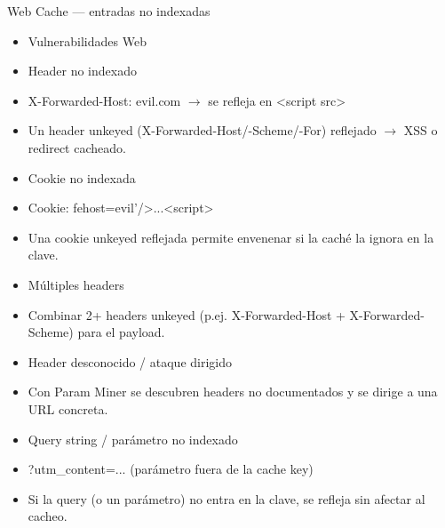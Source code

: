 \documentclass[aspectratio=169,10pt]{beamer}
\begin{document}
\begin{frame}[allowframebreaks]{Web Cache --- entradas no indexadas}
\small
  \begin{itemize}
  \item Vulnerabilidades Web
  \item Header no indexado
  \item X-Forwarded-Host: evil.com $\rightarrow$ se refleja en \textless{}script src\textgreater{}
  \item Un header unkeyed (X-Forwarded-Host/-Scheme/-For) reflejado $\rightarrow$ XSS o redirect cacheado.
  \item Cookie no indexada
  \item Cookie: fehost=evil'/\textgreater{}...\textless{}script\textgreater{}
  \item Una cookie unkeyed reflejada permite envenenar si la caché la ignora en la clave.
  \item Múltiples headers
  \item Combinar 2+ headers unkeyed (p.ej. X-Forwarded-Host + X-Forwarded-Scheme) para el payload.
  \item Header desconocido / ataque dirigido
  \item Con Param Miner se descubren headers no documentados y se dirige a una URL concreta.
  \item Query string / parámetro no indexado
  \item ?utm\_content=... (parámetro fuera de la cache key)
  \item Si la query (o un parámetro) no entra en la clave, se refleja sin afectar al cacheo.
  \end{itemize}
\end{frame}
\end{document}
